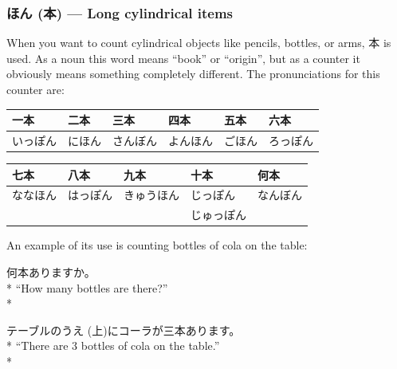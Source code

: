 \documentclass[11pt, b5paper, twoside, openright, onecolumn]{book}
\makeatletter
\newcommand*{\rubystack}[2]{{\relscale{0.5}%
  \begin{tabular}[b]{@{}c@{}}%
    {#1}\\%
   {\textscale{2}{#2}}%
  \end{tabular}}%
}
\DeclareRobustCommand*{\ruby}[2]{%
  \mbox{%
    \setlength{\parskip}{0ex}%
    \BeginAccSupp{method=pdfstringdef,ActualText={#1}}%
      \rubystack{\phantom{#2}}{#1}%
      \llap{%
        \rubystack{#2}{\phantom{#1}}%
      }%
    \EndAccSupp{}%
  }%
}
\renewcommand*{\ruby}[2]{#2 (#1)}%
\newenvironment{exampleblock}{
\setlength{\parindent}{0.6in}
\begin{minipage}[t]{\dimexpr\textwidth-\parindent}}
{\end{minipage}}
\newenvironment{mytabular}[1]{\noindent\hspace{0.4in}
\begin{tabular}[h]{#1}}{\end{tabular}}
\makeatother
\begin{document}
\subsubsection{\ruby{本}{ほん} — Long cylindrical items}


When you want to count cylindrical objects like pencils‚ bottles‚ or arms‚ 本 is used. As a noun this word means “book” or “origin”‚ but as a counter it obviously means something completely different. The pronunciations for this counter are:

\vspace{0.5cm}
\smaller
\begin{mytabular}{| l  l  l  l  l  l |}\hline 
\rule{0pt}{2.4ex}一本 & 二本 & 三本 & 四本 & 五本 & 六本\\ 
\hline
\rule{0pt}{2.4ex}いっぽん & にほん & さんぼん & よんほん & ごほん & ろっぽん\\ 
\hline 
\end{mytabular}
\larger
\vspace{0.5cm}

\smaller
\begin{mytabular}{| l  l  l  l  l |}\hline 
\rule{0pt}{2.4ex}七本 & 八本 & 九本 & 十本 & 何本\\ 
\hline
\rule{0pt}{2.4ex}ななほん & はっぽん & きゅうほん & じっぽん & なんぼん\\ 
\rule{0pt}{2.4ex} &  &  & じゅっぽん & \\ 
\hline 
\end{mytabular}
\larger
\vspace{0.5cm}


An example of its use is counting bottles of cola on the table:

\vspace{0.4cm}
\begin{exampleblock}
何本ありますか。 \\* 
“How many bottles are there?” \\* 
\end{exampleblock}
\vspace{0.2cm}

\begin{exampleblock}
テーブルの\ruby{上}{うえ}にコーラが三本あります。 \\* 
“There are 3 bottles of cola on the table.” \\* 
\end{exampleblock}
\vspace{0.2cm}
\end{document}
